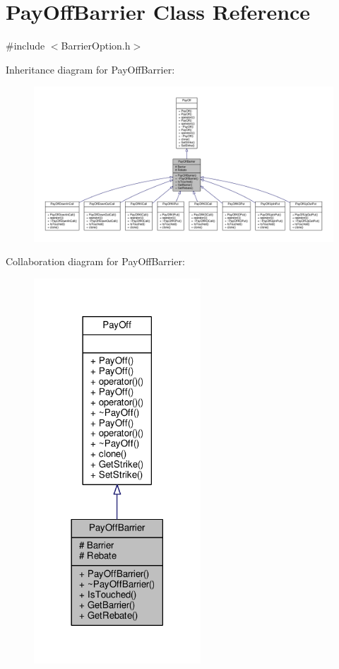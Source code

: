 \hypertarget{classPayOffBarrier}{}\section{Pay\+Off\+Barrier Class Reference}
\label{classPayOffBarrier}


{\ttfamily \#include $<$Barrier\+Option.\+h$>$}



Inheritance diagram for Pay\+Off\+Barrier\+:
\nopagebreak
\begin{figure}[H]
\begin{center}
\leavevmode
\includegraphics[width=350pt]{classPayOffBarrier__inherit__graph}
\end{center}
\end{figure}


Collaboration diagram for Pay\+Off\+Barrier\+:
\nopagebreak
\begin{figure}[H]
\begin{center}
\leavevmode
\includegraphics[width=177pt]{classPayOffBarrier__coll__graph}
\end{center}
\end{figure}
